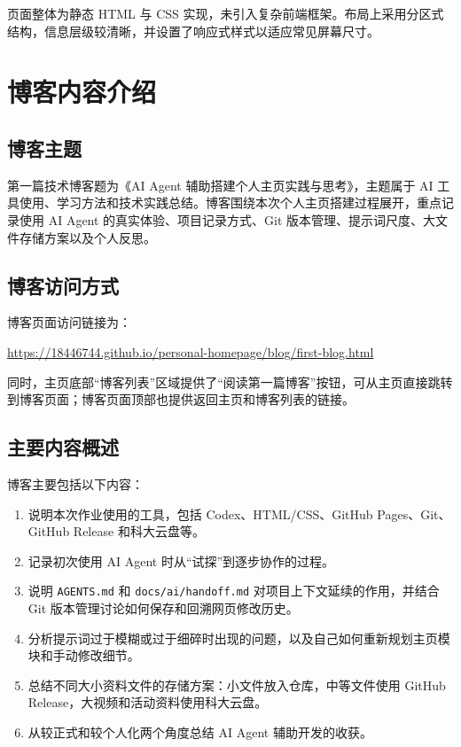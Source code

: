 \documentclass[UTF8,a4paper,12pt]{ctexart}
\begin{document}
页面整体为静态 HTML 与 CSS 实现，未引入复杂前端框架。布局上采用分区式结构，信息层级较清晰，并设置了响应式样式以适应常见屏幕尺寸。

\section{博客内容介绍}

\subsection{博客主题}

第一篇技术博客题为《AI Agent 辅助搭建个人主页实践与思考》，主题属于 AI 工具使用、学习方法和技术实践总结。博客围绕本次个人主页搭建过程展开，重点记录使用 AI Agent 的真实体验、项目记录方式、Git 版本管理、提示词尺度、大文件存储方案以及个人反思。

\subsection{博客访问方式}

博客页面访问链接为：
\begin{center}
  \url{https://18446744.github.io/personal-homepage/blog/first-blog.html}
\end{center}

同时，主页底部“博客列表”区域提供了“阅读第一篇博客”按钮，可从主页直接跳转到博客页面；博客页面顶部也提供返回主页和博客列表的链接。

\subsection{主要内容概述}

博客主要包括以下内容：

\begin{enumerate}
  \item 说明本次作业使用的工具，包括 Codex、HTML/CSS、GitHub Pages、Git、GitHub Release 和科大云盘等。
  \item 记录初次使用 AI Agent 时从“试探”到逐步协作的过程。
  \item 说明 \texttt{AGENTS.md} 和 \texttt{docs/ai/handoff.md} 对项目上下文延续的作用，并结合 Git 版本管理讨论如何保存和回溯网页修改历史。
  \item 分析提示词过于模糊或过于细碎时出现的问题，以及自己如何重新规划主页模块和手动修改细节。
  \item 总结不同大小资料文件的存储方案：小文件放入仓库，中等文件使用 GitHub Release，大视频和活动资料使用科大云盘。
  \item 从较正式和较个人化两个角度总结 AI Agent 辅助开发的收获。
\end{enumerate}
\end{document}
